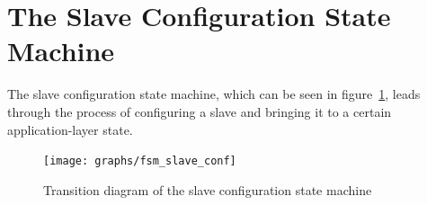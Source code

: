 \documentclass[a4paper,12pt,BCOR6mm,bibtotoc,idxtotoc]{scrbook}
\begin{document}

\section{The Slave Configuration State Machine}
\label{sec:fsm-conf}

The slave configuration state machine, which can be seen in
figure~\ref{fig:fsm-slaveconf}, leads through the process of configuring a
slave and bringing it to a certain application-layer state.

\begin{figure}[htbp]
  \centering
  \texttt{[image: graphs/fsm\_slave\_conf]}
  \caption{Transition diagram of the slave configuration state
    machine}
  \label{fig:fsm-slaveconf}
\end{figure}
\end{document}
